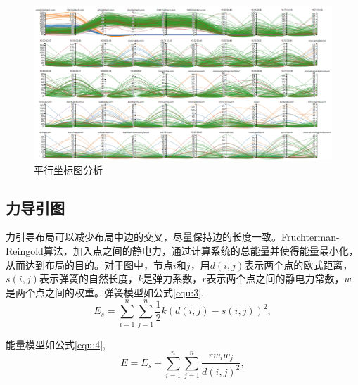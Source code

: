 \documentclass[journal]{vgtc}                %
\begin{document}
\begin{figure}
\centering
\includegraphics[width=0.9\linewidth]{pictures/6.png}
\caption{平行坐标图分析}
\label{fig:parrell}
\end{figure}

\subsection{力导引图}
力引导布局\cite{eades1984heuristic}可以减少布局中边的交叉，尽量保持边的长度一致。Fruchterman-Reingold算法，加入点之间的静电力，通过计算系统的总能量并使得能量最小化，从而达到布局的目的。对于图中，节点$i$和$j$，用$d(i,j)$表示两个点的欧式距离，$s(i,j)$表示弹簧的自然长度，$k$是弹力系数，$r$表示两个点之间的静电力常数，$w$是两个点之间的权重。弹簧模型如公式\ref{equ:3},
\begin{equation}
\label{equ:3}
E_s = \sum_{i=1}^{n}\sum_{j=1}^{n}\frac{1}{2}k(d(i,j)-s(i,j))^2,
\end{equation}

能量模型如公式\ref{equ:4},
\begin{equation}
\label{equ:4}
E=E_s+\sum_{i=1}^{n}\sum_{j=1}^{n}\frac{rw_iw_j}{d(i,j)^2},
\end{equation}


%	
\end{document}
